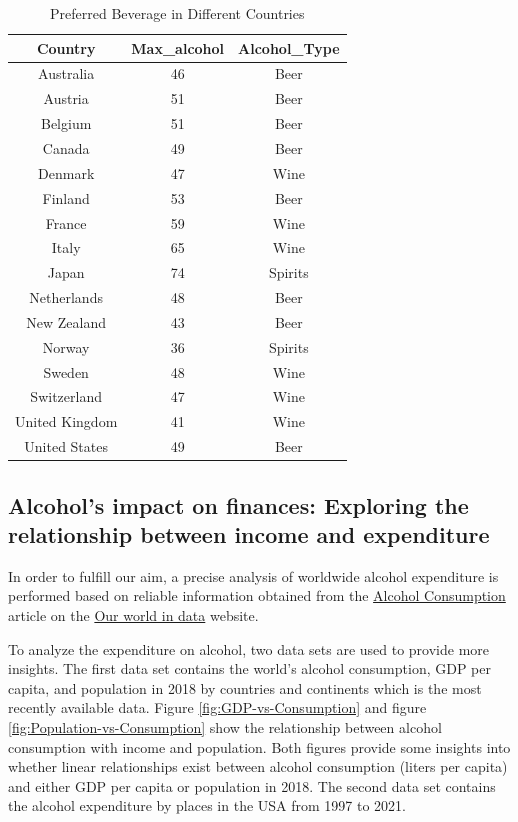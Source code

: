 \documentclass[11pt,a4paper,]{article}
\begin{document}
\begin{table}

\caption{\label{tab:table}Preferred Beverage in Different Countries}
\centering
\begin{tabular}[t]{c|c|c}
\hline
Country & Max\_alcohol & Alcohol\_Type\\
\hline
Australia & 46 & Beer\\
\hline
Austria & 51 & Beer\\
\hline
Belgium & 51 & Beer\\
\hline
Canada & 49 & Beer\\
\hline
Denmark & 47 & Wine\\
\hline
Finland & 53 & Beer\\
\hline
France & 59 & Wine\\
\hline
Italy & 65 & Wine\\
\hline
Japan & 74 & Spirits\\
\hline
Netherlands & 48 & Beer\\
\hline
New Zealand & 43 & Beer\\
\hline
Norway & 36 & Spirits\\
\hline
Sweden & 48 & Wine\\
\hline
Switzerland & 47 & Wine\\
\hline
United Kingdom & 41 & Wine\\
\hline
United States & 49 & Beer\\
\hline
\end{tabular}
\end{table}
\pagebreak

\subsection{Alcohol's impact on finances: Exploring the relationship between income and expenditure}\label{alcohols-impact-on-finances-exploring-the-relationship-between-income-and-expenditure}

In order to fulfill our aim, a precise analysis of worldwide alcohol expenditure is performed based on reliable information obtained from the \href{https://ourworldindata.org/alcohol-consumption}{Alcohol Consumption} article on the \href{https://ourworldindata.org/}{Our world in data} website.

To analyze the expenditure on alcohol, two data sets are used to provide more insights. The first data set contains the world's alcohol consumption, GDP per capita, and population in 2018 by countries and continents which is the most recently available data.
Figure \ref{fig:GDP-vs-Consumption} and figure \ref{fig:Population-vs-Consumption} show the relationship between alcohol consumption with income and population. Both figures provide some insights into whether linear relationships exist between alcohol consumption (liters per capita) and either GDP per capita or population in 2018. The second data set contains the alcohol expenditure by places in the USA from 1997 to 2021.
\end{document}
